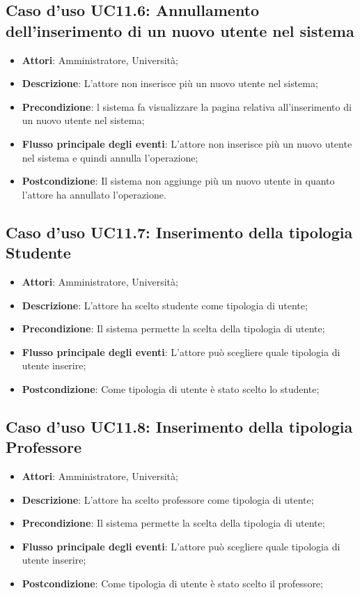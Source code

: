 \subsection{Caso d'uso \texorpdfstring{UC11.6}{UC11.6}: Annullamento dell'inserimento di un nuovo utente nel sistema}
\begin{itemize}
	\item \textbf{Attori}: Amministratore, Università;
	\item \textbf{Descrizione}: L'attore non inserisce più un nuovo utente nel sistema;
	\item \textbf{Precondizione}: l sistema fa visualizzare la pagina relativa all'inserimento di un nuovo utente nel sistema;
	
	\item \textbf{Flusso principale degli eventi}: L'attore non inserisce più un nuovo utente nel sistema e quindi annulla l'operazione;
	\item \textbf{Postcondizione}: Il sistema non aggiunge più un nuovo utente in quanto l'attore ha annullato l'operazione.
	
\end{itemize}
\subsection{Caso d'uso \texorpdfstring{UC11.7}{UC11.7}: Inserimento della tipologia Studente}
\begin{itemize}
	\item \textbf{Attori}: Amministratore, Università;
	\item \textbf{Descrizione}: L'attore ha scelto studente come tipologia di utente; 
	\item \textbf{Precondizione}: Il sistema permette la scelta della tipologia di utente;
	\item \textbf{Flusso principale degli eventi}: L'attore può scegliere quale tipologia di utente inserire;
	\item \textbf{Postcondizione}: Come tipologia di utente è stato scelto lo studente;
\end{itemize}
\subsection{Caso d'uso \texorpdfstring{UC11.8}{UC11.8}: Inserimento della tipologia Professore}
\begin{itemize}
	\item \textbf{Attori}: Amministratore, Università;
	\item \textbf{Descrizione}: L'attore ha scelto professore come tipologia di utente; 
	\item \textbf{Precondizione}: Il sistema permette la scelta della tipologia di utente;
	\item \textbf{Flusso principale degli eventi}: L'attore può scegliere quale tipologia di utente inserire;
	\item \textbf{Postcondizione}: Come tipologia di utente è stato scelto il professore;
\end{itemize}
